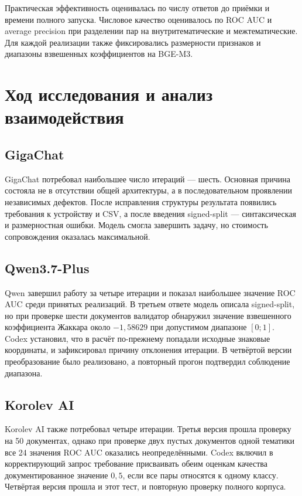 \documentclass[a4paper,12pt]{extreport}
\begin{document}
Практическая эффективность оценивалась по числу ответов до приёмки и времени полного запуска. Числовое качество оценивалось по ROC AUC и average precision при разделении пар на внутритематические и межтематические. Для каждой реализации также фиксировались размерности признаков и диапазоны взвешенных коэффициентов на BGE-M3.

\section{Ход исследования и анализ взаимодействия}

\subsection{GigaChat}

GigaChat потребовал наибольшее число итераций --- шесть. Основная причина состояла не в отсутствии общей архитектуры, а в последовательном проявлении независимых дефектов. После исправления структуры результата появились требования к устройству и CSV, а после введения signed-split --- синтаксическая и размерностная ошибки. Модель смогла завершить задачу, но стоимость сопровождения оказалась максимальной.

\subsection{Qwen3.7-Plus}

Qwen завершил работу за четыре итерации и показал наибольшее значение ROC AUC среди принятых реализаций. В третьем ответе модель описала signed-split, но при проверке шести документов валидатор обнаружил значение взвешенного коэффициента Жаккара около $-1{,}58629$ при допустимом диапазоне $[0;1]$. Codex установил, что в расчёт по-прежнему попадали исходные знаковые координаты, и зафиксировал причину отклонения итерации. В четвёртой версии преобразование было реализовано, а повторный прогон подтвердил соблюдение диапазона.

\subsection{Korolev AI}

Korolev AI также потребовал четыре итерации. Третья версия прошла проверку на 50 документах, однако при проверке двух пустых документов одной тематики все 24 значения ROC AUC оказались неопределёнными. Codex включил в корректирующий запрос требование присваивать обеим оценкам качества документированное значение $0{,}5$, если все пары относятся к одному классу. Четвёртая версия прошла и этот тест, и повторную проверку полного корпуса.
\end{document}
